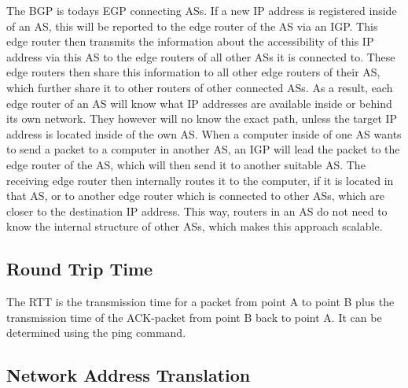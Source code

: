The \ac{BGP} is todays \acs{EGP} connecting \acp{AS}. If a new IP address is registered inside of an \ac{AS}, this will be reported to the edge router of the \ac{AS} via an \ac{IGP}. This edge router then transmits the information about the accessibility of this IP address via this \ac{AS} to the edge routers of all other \acp{AS} it is connected to. These edge routers then share this information to all other edge routers of their \ac{AS}, which further share it to other routers of other connected \acp{AS}. As a result, each edge router of an \ac{AS} will know what IP addresses are available inside or behind its own network. They however will no know the exact path, unless the target IP address is located inside of the own \ac{AS}. When a computer inside of one \ac{AS} wants to send a packet to a computer in another \ac{AS}, an \ac{IGP} will lead the packet to the edge router of the \ac{AS}, which will then send it to another suitable \ac{AS}. The receiving edge router then internally routes it to the computer, if it is located in that \ac{AS}, or to another edge router which is connected to other \acp{AS}, which are closer to the destination IP address. This way, routers in an \ac{AS} do not need to know the internal structure of other \acp{AS}, which makes this approach scalable.

\subsection{Round Trip Time}

The \ac{RTT} is the transmission time for a packet from point A to point B plus the transmission time of the ACK-packet from point B back to point A. It can be determined using the ping command.

\subsection{Network Address Translation}

